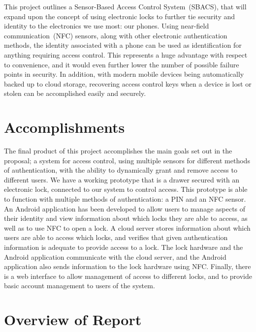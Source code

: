 \documentclass[12pt]{report}
\let\Oldsection\section
\renewcommand{\section}{\FloatBarrier\Oldsection}
\begin{document}
This project outlines a Sensor-Based Access Control System~(SBACS), that will expand upon the concept of using electronic
locks to further tie security and identity to the electronics we use most: our phones. Using near-field 
communication~(NFC) sensors, along with other electronic authentication methods, the identity associated with a phone
can be used as
identification for anything requiring access control. This represents a huge advantage with respect to convenience, and 
it would even further lower the number of possible failure points in security. In addition, with modern mobile devices 
being automatically backed up to cloud storage, recovering access control keys when a device is lost or stolen can be accomplished 
easily and securely.

\section{Accomplishments} \label{accomplishments}

The final product of this project accomplishes the main goals set out in the proposal; a system for access control,
using multiple sensors for different methods of authentication, with the ability to dynamically grant and remove
access to different users. We have a working prototype that is a drawer secured with an electronic lock, connected
to our system to control access. This prototype is able to function with multiple methods of authentication: a PIN
and an NFC sensor. An Android application has been developed to allow users to manage aspects of their identity and
view information about which locks they are able to access, as well as to use NFC to open a lock. A cloud server stores
information about which users are able to access which locks, and verifies that given authentication information is
adequate to provide access to a lock. The lock hardware and the Android application communicate with the cloud server,
and the Android application also sends information to the lock hardware using NFC. Finally, there is a web interface
to allow management of access to different locks, and to provide basic account management to users of the system.

\section{Overview of Report} \label{overview-of-report}
\end{document}

